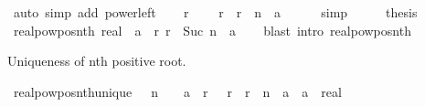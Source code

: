 \begin{isabellebody}
\ {\isacharparenleft}{\kern0pt}auto\ simp\ add{\isacharcolon}{\kern0pt}\ power{\isacharunderscore}{\kern0pt}{}{\isacharunderscore}{\kern0pt}left{\isacharparenright}{\kern0pt}\isanewline
\ \ \isamarkupfalse%
\ r\ \isamarkupfalse%
\ {\isachardoublequoteopen}{}\ {\isacharless}{\kern0pt}\ r\ {\isasymand}\ r\ {\isacharcircum}{\kern0pt}\ n\ {\isacharequal}{\kern0pt}\ a{\isachardoublequoteclose}\isanewline
\ \ \ \ \isamarkupfalse%
\ simp\isanewline
\ \ \isamarkupfalse%
\ \isamarkupfalse%
\ {\isacharquery}{\kern0pt}thesis\ \isacommand{{\isachardot}{\kern0pt}{\isachardot}{\kern0pt}}\isamarkupfalse%
\isanewline
{}\isamarkupfalse%
%
\endisatagproof
{\isafoldproof}%
%
\isadelimproof
\isanewline
%
\endisadelimproof
\isanewline
\isanewline
{}\isamarkupfalse%
\ realpow{\isacharunderscore}{\kern0pt}pos{\isacharunderscore}{\kern0pt}nth{}{\isacharcolon}{\kern0pt}\ {\isachardoublequoteopen}{\isacharparenleft}{\kern0pt}{}{\isacharcolon}{\kern0pt}{\isacharcolon}{\kern0pt}real{\isacharparenright}{\kern0pt}\ {\isacharless}{\kern0pt}\ a\ {\isasymLongrightarrow}\ {\isasymexists}r{\isachargreater}{\kern0pt}{}{\isachardot}{\kern0pt}\ r\ {\isacharcircum}{\kern0pt}\ Suc\ n\ {\isacharequal}{\kern0pt}\ a{\isachardoublequoteclose}\isanewline
%
\isadelimproof
\ \ %
\endisadelimproof
%
\isatagproof
{}\isamarkupfalse%
\ {\isacharparenleft}{\kern0pt}blast\ intro{\isacharcolon}{\kern0pt}\ realpow{\isacharunderscore}{\kern0pt}pos{\isacharunderscore}{\kern0pt}nth{\isacharparenright}{\kern0pt}%
\endisatagproof
{\isafoldproof}%
%
\isadelimproof
%
\endisadelimproof
%
\begin{isamarkuptext}%
Uniqueness of nth positive root.%
\end{isamarkuptext}\isamarkuptrue%
\isamarkupfalse%
\ realpow{\isacharunderscore}{\kern0pt}pos{\isacharunderscore}{\kern0pt}nth{\isacharunderscore}{\kern0pt}unique{\isacharcolon}{\kern0pt}\ {\isachardoublequoteopen}{}\ {\isacharless}{\kern0pt}\ n\ {\isasymLongrightarrow}\ {}\ {\isacharless}{\kern0pt}\ a\ {\isasymLongrightarrow}\ {\isasymexists}{\isacharbang}{\kern0pt}r{\isachardot}{\kern0pt}\ {}\ {\isacharless}{\kern0pt}\ r\ {\isasymand}\ r\ {\isacharcircum}{\kern0pt}\ n\ {\isacharequal}{\kern0pt}\ a{\isachardoublequoteclose}\ \ a\ {\isacharcolon}{\kern0pt}{\isacharcolon}{\kern0pt}\ real\isanewline
%
\isadelimproof
\ \ %
\endisadelimproof
%
\isatagproof

\end{isabellebody}
